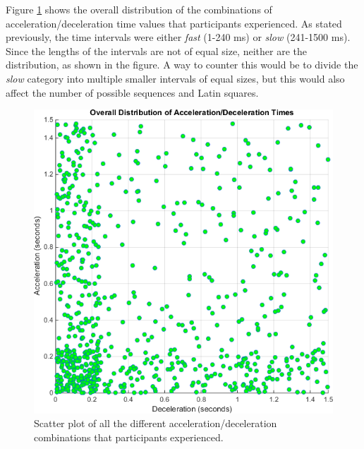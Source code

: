 Figure \ref{fig:overallDistribution} shows the overall distribution of the combinations of acceleration/deceleration time values that participants experienced. As stated previously, the time intervals were either \textit{fast} (1-240 ms) or \textit{slow} (241-1500 ms). Since the lengths of the intervals are not of equal size, neither are the distribution, as shown in the figure. A way to counter this would be to divide the \textit{slow} category into multiple smaller intervals of equal sizes, but this would also affect the number of possible sequences and Latin squares.



\begin{figure}[htbp]
\centering
\includegraphics[width=0.5\columnwidth]{Pics/Classes/overall_distribution}
\caption{Scatter plot of all the different acceleration/deceleration combinations that participants experienced.}
\label{fig:overallDistribution}
\end{figure}


